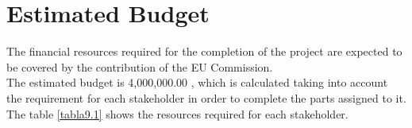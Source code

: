 \section{Estimated Budget}

The financial resources required for the completion of the project are expected to be covered by the contribution of the EU Commission.\\

The estimated budget is 4,000,000.00 \EUR, which is calculated taking into account the requirement for each stakeholder in order to complete the parts assigned to it. The table \ref{tabla9.1} shows the resources required for each stakeholder.


